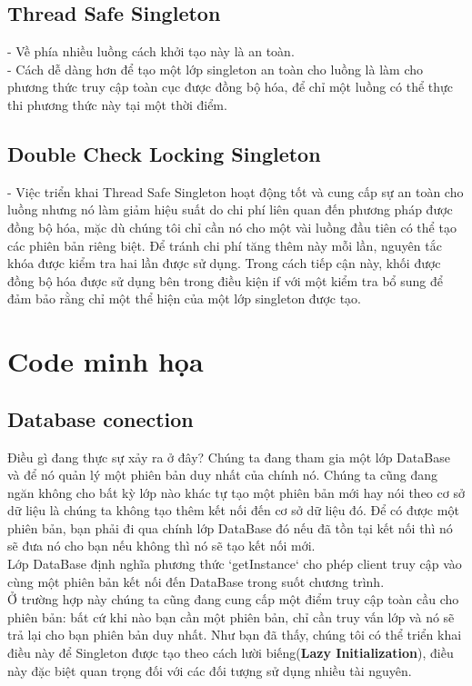 \subsection{Thread Safe Singleton}
\noindent
- Về phía nhiều luồng cách khởi tạo này là an toàn.\\
- Cách dễ dàng hơn để tạo một lớp singleton an toàn cho luồng là làm cho phương thức truy cập toàn cục được đồng bộ hóa, để chỉ một luồng có thể thực thi phương thức này tại một thời điểm.

\subsection{Double Check Locking Singleton}
\noindent
- Việc triển khai Thread Safe Singleton hoạt động tốt và cung cấp sự an toàn cho luồng nhưng nó làm giảm hiệu suất do chi phí liên quan đến phương pháp được đồng bộ hóa, mặc dù chúng tôi chỉ cần nó cho một vài luồng đầu tiên có thể tạo các phiên bản riêng biệt. Để tránh chi phí tăng thêm này mỗi lần, nguyên tắc khóa được kiểm tra hai lần được sử dụng. Trong cách tiếp cận này, khối được đồng bộ hóa được sử dụng bên trong điều kiện if với một kiểm tra bổ sung để đảm bảo rằng chỉ một thể hiện của một lớp singleton được tạo.

\section{Code minh họa}
\subsection{Database conection}
Điều gì đang thực sự xảy ra ở đây? Chúng ta đang tham gia một lớp DataBase và để nó quản lý một phiên bản duy nhất của chính nó. Chúng ta cũng đang ngăn không cho bất kỳ lớp nào khác tự tạo một phiên bản mới hay nói theo cơ sở dữ liệu là chúng ta không tạo thêm kết nối đến cơ sở dữ liệu đó. Để có được một phiên bản, bạn phải đi qua chính lớp DataBase đó nếu đã tồn tại kết nối thì nó sẽ đưa nó cho bạn nếu không thì nó sẽ tạo kết nối mới. \\

Lớp DataBase định nghĩa phương thức `getInstance` cho phép client truy cập vào cùng một phiên bản kết nối đến DataBase trong suốt chương trình. \\

Ở trường hợp này chúng ta cũng đang cung cấp một điểm truy cập toàn cầu cho phiên bản: bất cứ khi nào bạn cần một phiên bản, chỉ cần truy vấn lớp và nó sẽ trả lại cho bạn phiên bản duy nhất. Như bạn đã thấy, chúng tôi có thể triển khai điều này để Singleton được tạo theo cách lười biếng(\textbf{Lazy Initialization}), điều này đặc biệt quan trọng đối với các đối tượng sử dụng nhiều tài nguyên. \\

